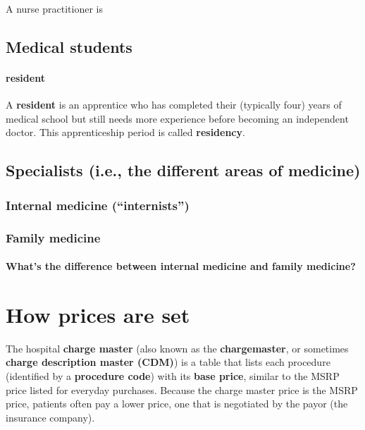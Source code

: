 \documentclass{article}
\begin{document}
A nurse practitioner is

\subsection{Medical students}

\paragraph{resident} A {\bf resident} is an apprentice who has completed their (typically four) years of medical school but still needs more experience before becoming an independent doctor. This apprenticeship period is called {\bf residency}.

\subsection{Specialists (i.e., the different areas of medicine)}

\subsubsection{Internal medicine (``internists'')}

\subsubsection{Family medicine} \cite{what-is-family-medicine}

\begin{tcolorbox}[colframe=Melon, colback=Melon!30]
\paragraph{What's the difference between internal medicine and family medicine?} \cite{diff-bt-internal-family}
\end{tcolorbox}

\section{How prices are set}

The hospital {\bf charge master} (also known as the {\bf chargemaster}, or sometimes {\bf charge description master (CDM)}) is a table that lists each procedure (identified by a {\bf procedure code}) with its {\bf base price}, similar to the MSRP price listed for everyday purchases. Because the charge master price is the MSRP price, patients often pay a lower price, one that is negotiated by the payor (the insurance company).
\end{document}
